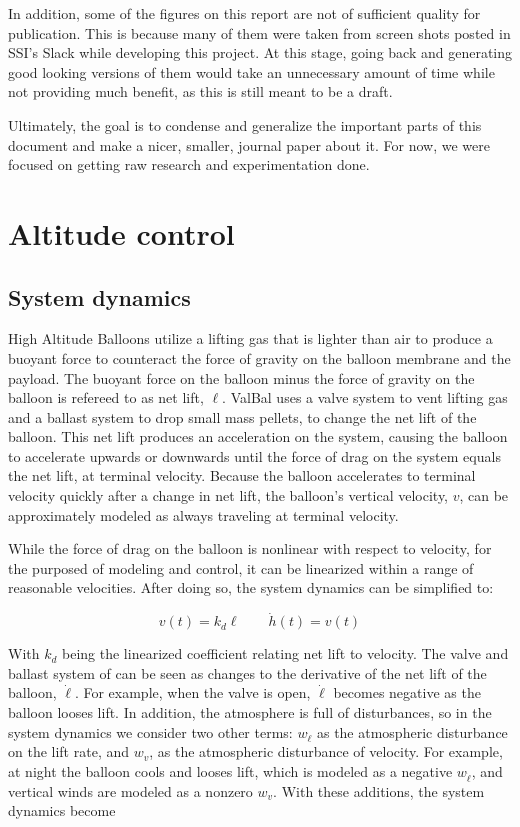 \documentclass[11pt]{scrartcl} %
\begin{document}
In addition, some of the figures on this report are not of sufficient quality for publication. This is because many of them were taken from screen shots posted in SSI's Slack while developing this project. At this stage, going back and generating good looking versions of them would take an unnecessary amount of time while not providing much benefit, as this is still meant to be a draft.

Ultimately, the goal is to condense and generalize the important parts of this document and make a nicer, smaller, journal paper about it. For now, we were focused on getting raw research and experimentation done.


\section{Altitude control}
\subsection{System dynamics}

High Altitude Balloons utilize a lifting gas that is lighter than air to produce a buoyant force to counteract the force of gravity on the balloon membrane and the payload. The buoyant force on the balloon minus the force of gravity on the balloon is refereed to as net lift, $\ell$. ValBal uses a valve system to vent lifting gas and a ballast system to drop small mass pellets, to change the net lift of the balloon. This net lift produces an acceleration on the system, causing the balloon to accelerate upwards or downwards until the force of drag on the system equals the net lift, at terminal velocity. Because the balloon accelerates to terminal velocity quickly after a change in net lift, the balloon's vertical velocity, $v$, can be approximately modeled as always traveling at terminal velocity.

While the force of drag on the balloon is nonlinear with respect to velocity, for the purposed of modeling and control, it can be linearized within a range of reasonable velocities. After doing so, the system dynamics can be simplified to:

\[ v(t) = k_d \ell \qquad \dot h(t) = v(t)\]

With $k_d$ being the linearized coefficient relating net lift to velocity. The valve and ballast system of can be seen as changes to the derivative of the net lift of the balloon, $\dot \ell$. For example, when the valve is open, $\dot \ell$ becomes negative as the balloon looses lift. In addition, the atmosphere is full of disturbances, so in the system dynamics we consider two other terms: $w_{\dot \ell}$ as the atmospheric disturbance on the lift rate, and $w_v$, as the atmospheric disturbance of velocity. For example, at night the balloon cools and looses lift, which is modeled as a negative $w_{\dot \ell}$, and vertical winds are modeled as a nonzero $w_v$. With these additions, the system dynamics become
\end{document}

